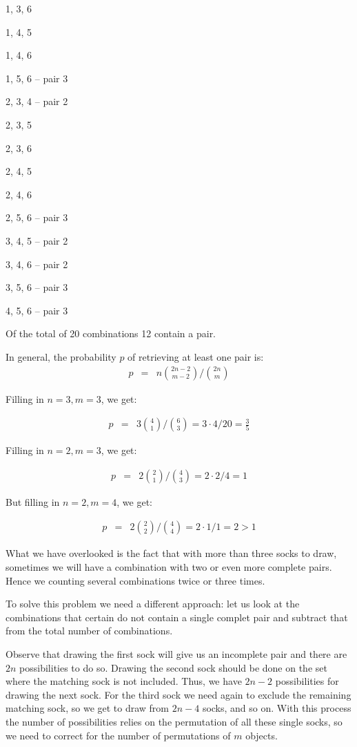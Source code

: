 \documentclass[onecolumn]{article}
\begin{document}
1, 3, 6

1, 4, 5

1, 4, 6

1, 5, 6 -- pair 3

2, 3, 4 -- pair 2

2, 3, 5

2, 3, 6

2, 4, 5

2, 4, 6

2, 5, 6 -- pair 3

3, 4, 5 -- pair 2

3, 4, 6 -- pair 2

3, 5, 6 -- pair 3

4, 5, 6 -- pair 3

Of the total of 20 combinations 12 contain a pair.

In general, the probability $p$ of retrieving at least one pair is:
%
\begin{eqnarray}
\nonumber p &=& n \binom{2n-2}{m-2} \bigg/ \binom{2n}{m}
\end{eqnarray}

Filling in $n = 3, m = 3$, we get:

\begin{eqnarray}
\nonumber p &=& 3 \binom{4}{1} \bigg/ \binom{6}{3} = 3 \cdot 4 / 20 = \frac{3}{5}
\end{eqnarray}

Filling in $n = 2, m = 3$, we get:

\begin{eqnarray}
\nonumber p &=& 2 \binom{2}{1} \bigg/ \binom{4}{3} = 2 \cdot 2 / 4 = 1
\end{eqnarray}

But filling in $n =2, m = 4$, we get:

\begin{eqnarray}
\nonumber p &=& 2 \binom{2}{2} \bigg/ \binom{4}{4} = 2 \cdot 1 / 1 = 2 > 1
\end{eqnarray}

What we have overlooked is the fact that with more than three socks to draw,
sometimes we will have a combination with two or even more complete pairs.
Hence we counting several combinations twice or three times.

To solve this problem we need a different approach: let us look at the combinations
that certain do not contain a single complet pair and subtract that from the
total number of combinations.

Observe that drawing the first sock will give us an incomplete pair and there
are $2n$ possibilities to do so. Drawing the second sock should be done on the set where
the matching sock is not included. Thus, we have $2n-2$ possibilities for drawing the
next sock. For the third sock we need again to exclude the remaining matching sock,
so we get to draw from $2n-4$ socks, and so on. With this process the number of
possibilities relies on the permutation of all these single socks, so we need to
correct for the number of permutations of $m$ objects.
\end{document}
